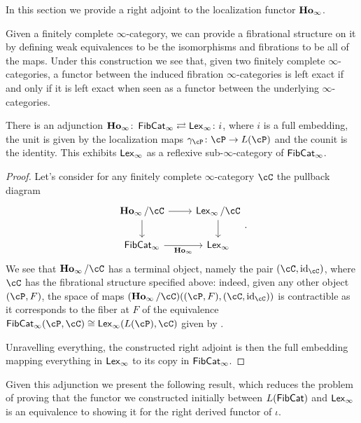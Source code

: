 \documentclass[a4paper,12pt,openany]{scrartcl}
\begin{document}
In this section we provide a right adjoint to the localization functor $\operatorname{\mathbf{Ho}_\infty}$.

\begin{rmk}
  Given a finitely complete $\infty$-category, we can provide a fibrational
  structure on it by defining weak equivalences to be the isomorphisms and
  fibrations to be all of the maps. Under this construction we see that, given
  two finitely complete $\infty$-categories, a functor between the induced
  fibration $\infty$-categories is left exact if and only if it is left exact
  when seen as a functor between the underlying $\infty$-categories.
\end{rmk}

\begin{prop}\label{adj}
  There is an adjunction $\operatorname{\mathbf{Ho}_\infty}\colon\operatorname{\mathsf{FibCat}}_\infty\rightleftarrows\operatorname{\mathsf{Lex}_\infty}\colon
  i$, where $i$ is a full embedding, the unit is given by the
  localization maps $\gamma_{\cP}\colon\cP\rightarrow L(\cP)$ and the counit is
  the identity. This exhibits $\operatorname{\mathsf{Lex}_\infty}$ as a reflexive sub-$\infty$-category of
  $\operatorname{\mathsf{FibCat}}_\infty$.
\end{prop}
\begin{proof}
  Let's consider for any finitely complete $\infty$-category $\cC$ the pullback
  diagram
  \[\begin{tikzcd}
    {\Hoi/\cC} & {\Lexi/\cC} \\
    {\FibCat_\infty} & {\Lexi}
    \arrow["\Hoi"', from=2-1, to=2-2]
    \arrow[from=1-2, to=2-2]
    \arrow[from=1-1, to=2-1]
    \arrow[from=1-1, to=1-2]
  \end{tikzcd}.\]
  We see that $\Hoi/\cC$ has a terminal object, namely the pair $(\cC,\id_\cC)$,
  where $\cC$ has the fibrational structure specified above: indeed, given any
  other object $(\cP,F)$, the space of maps
  $(\Hoi/\cC)((\cP,F),(\cC,\id_\cC))$ is contractible as it corresponds to the
  fiber at $F$ of the equivalence
  $\FibCat_\infty(\cP,\cC)\cong\Lexi(L(\cP),\cC)$ given by \cite[Prop.\
  7.5.11]{Cis19}.

  Unravelling everything, the constructed right adjoint is then the full
  embedding mapping everything in $\operatorname{\mathsf{Lex}_\infty}$ to its copy in $\operatorname{\mathsf{FibCat}}_\infty$.
\end{proof}

Given this adjunction we present the following result, which reduces the
problem of proving that the functor we constructed initially between $L(\operatorname{\mathsf{FibCat}})$
and $\operatorname{\mathsf{Lex}_\infty}$ is an equivalence to showing it for the right derived functor of
$\iota$.
\end{document}
